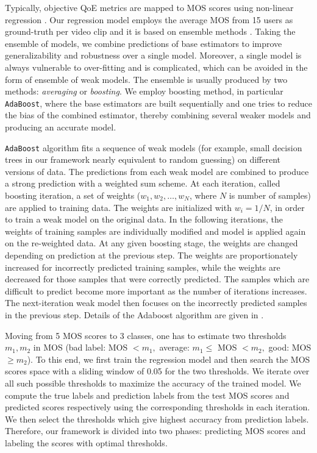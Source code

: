Typically, objective QoE metrics are mapped to MOS scores using non-linear regression \cite{cui2008image}. 
Our regression model employs the average MOS from 15 users as ground-truth per video clip and it is based on ensemble methods \cite{ensemblemethods2008}. 
Taking the ensemble of models, we combine predictions of base estimators to improve generalizability and robustness over a single model.
Moreover, a single model is always vulnerable to over-fitting and is complicated, which can be avoided in the form of ensemble of weak models.
The ensemble is usually produced by two methods: \textit{averaging} or \textit{boosting}. 
We employ boosting method, in particular \texttt{AdaBoost}\cite{freund1997decision}, where the base estimators are built sequentially and one tries to reduce the bias of the combined estimator, thereby combining several weaker models and producing an accurate model. 

\texttt{AdaBoost} algorithm fits a sequence of weak models (for example, small decision trees in our framework nearly equivalent to random guessing) on different versions of data. 
The predictions from each weak model are combined to produce a strong prediction with a weighted sum scheme. 
At each iteration, called boosting iteration, a set of weights ($w_1, w_2, …, w_N$, where $N$ is number of samples) are applied to training data.
The weights are initialized with $w_i = 1/N$, in order to train a weak model on the original data.
In the following iterations, the weights of training samples are individually modified and model is applied again on the re-weighted data.
At any given boosting stage, the weights are changed depending on prediction at the previous step.
The weights are proportionately increased for incorrectly predicted training samples, while the weights are decreased for those samples that were correctly predicted.
The samples which are difficult to predict become more important as the number of iterations increases.
The next-iteration weak model then focuses on the incorrectly predicted samples in the previous step.
Details of the Adaboost algorithm are given in \cite{freund1997decision}\cite{drucker1997improving}.

Moving from 5 MOS scores to 3 classes, one has to estimate two thresholds $m_1, m_2$ in MOS (bad label: MOS  $ < m_1,$ average: $m_1 \le$ MOS $< m_2,$ good: MOS $\ge m_2$).
To this end, we first train the regression model and then search the MOS scores space with a sliding window of 0.05 for the two thresholds. 
We iterate over all such possible thresholds to maximize the accuracy of the trained model. 
We compute the true labels and prediction labels from the test MOS scores and predicted scores respectively using the corresponding thresholds in each iteration. 
We then select the thresholds which give highest accuracy from prediction labels.
Therefore, our framework is divided into two phases: predicting MOS scores and labeling the scores with optimal thresholds.



